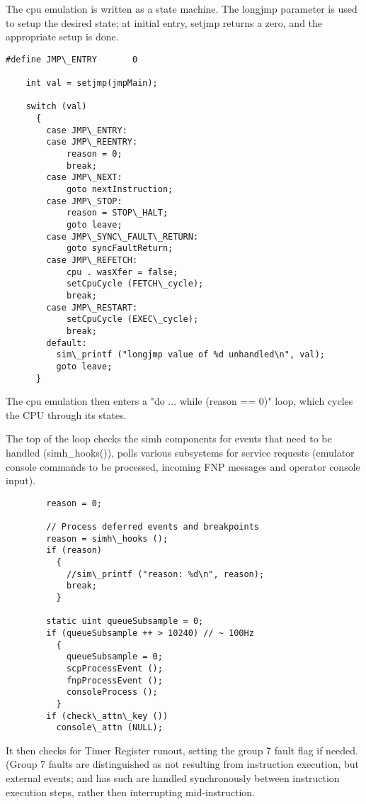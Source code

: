 \documentclass[notitlepage]{report}
\begin{document}
The cpu emulation is written as a state machine. The longjmp parameter is 
used to setup the desired state; at initial entry, setjmp returns a zero, 
and the appropriate setup is done.

\begin{verbatim}
#define JMP\_ENTRY       0

    int val = setjmp(jmpMain);

    switch (val)
      {
        case JMP\_ENTRY:
        case JMP\_REENTRY:
            reason = 0;
            break;
        case JMP\_NEXT:
            goto nextInstruction;
        case JMP\_STOP:
            reason = STOP\_HALT;
            goto leave;
        case JMP\_SYNC\_FAULT\_RETURN:
            goto syncFaultReturn;
        case JMP\_REFETCH:
            cpu . wasXfer = false;
            setCpuCycle (FETCH\_cycle);
            break;
        case JMP\_RESTART:
            setCpuCycle (EXEC\_cycle);
            break;
        default:
          sim\_printf ("longjmp value of %d unhandled\n", val);
          goto leave;
      }

\end{verbatim}

The cpu emulation then enters a "do {...} while (reason == 0)" loop,
which cycles the CPU through its states.

The top of the loop checks the simh components for events that need
to be handled (simh\_hooks()), polls various subsystems for service requests
(emulator console commands to be processed, incoming FNP messages and 
operator console input).

\begin{verbatim}
        reason = 0;

        // Process deferred events and breakpoints
        reason = simh\_hooks ();
        if (reason)
          {
            //sim\_printf ("reason: %d\n", reason);
            break;
          }

        static uint queueSubsample = 0;
        if (queueSubsample ++ > 10240) // ~ 100Hz
          {
            queueSubsample = 0;
            scpProcessEvent ();
            fnpProcessEvent ();
            consoleProcess ();
          }
        if (check\_attn\_key ())
          console\_attn (NULL);
\end{verbatim}

It then checks for Timer Register runout, setting the group 7 fault flag
if needed. (Group 7 faults are distinguished as not resulting from
instruction execution, but external events; and has such are handled
synchronously between instruction execution steps, rather then 
interrupting mid-instruction. 
\end{document}
